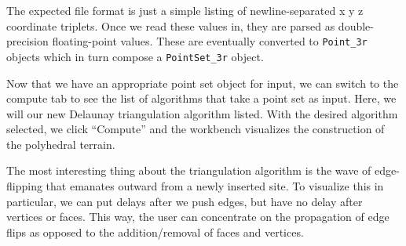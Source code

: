 The expected file format is just a simple listing of newline-separated x y z
coordinate triplets. Once we read these values in, they are parsed as
double-precision floating-point values. These are eventually converted to
\texttt{Point\_3r} objects which in turn compose a \texttt{PointSet\_3r} object.

Now that we have an appropriate point set object for input, we can switch to the
compute tab to see the list of algorithms that take a point set as input. Here,
we will our new Delaunay triangulation algorithm listed. With the desired
algorithm selected, we click ``Compute'' and the workbench visualizes the
construction of the polyhedral terrain.

The most interesting thing about the triangulation algorithm is the wave of
edge-flipping that emanates outward from a newly inserted site. To visualize
this in particular, we can put delays after we push edges, but have no delay
after vertices or faces. This way, the user can concentrate on the propagation
of edge flips as opposed to the addition/removal of faces and vertices.
